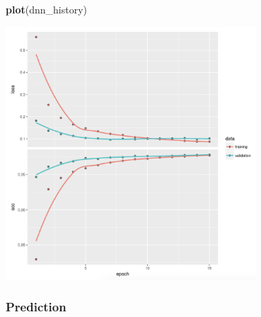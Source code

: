 \documentclass[12pt,]{krantz}
\makeatletter
\newenvironment{Shaded}{\begin{snugshade}}{\end{snugshade}}
\newcommand{\KeywordTok}[1]{\textcolor[rgb]{0.27,0.27,0.27}{\textbf{#1}}}
\newcommand{\NormalTok}[1]{#1}
\newcommand{\OperatorTok}[1]{\textcolor[rgb]{0.43,0.43,0.43}{\textbf{#1}}}
\newcommand{\StringTok}[1]{\textcolor[rgb]{0.5,0.5,0.5}{#1}}
\newenvironment{kframe}{%
\medskip{}
\setlength{\fboxsep}{.8em}
 \def\at@end@of@kframe{}%
 \ifinner\ifhmode%
  \def\at@end@of@kframe{\end{minipage}}%
  \begin{minipage}{\columnwidth}%
 \fi\fi%
 \def\FrameCommand##1{\hskip\@totalleftmargin \hskip-\fboxsep
 \colorbox{shadecolor}{##1}\hskip-\fboxsep
     \hskip-\linewidth \hskip-\@totalleftmargin \hskip\columnwidth}%
 \MakeFramed {\advance\hsize-\width
   \@totalleftmargin\z@ \linewidth\hsize
   \@setminipage}}%
 {\par\unskip\endMakeFramed%
 \at@end@of@kframe}
\renewenvironment{Shaded}{\begin{kframe}}{\end{kframe}}
\makeatother
\begin{document}
\begin{Shaded}
\begin{Highlighting}[]
\KeywordTok{plot}\NormalTok{(dnn_history)}
\end{Highlighting}
\end{Shaded}

\includegraphics[width=0.7\textwidth,height=\textheight]{images/dnn_history.png}

\hypertarget{prediction}{%
\subsubsection{Prediction}\label{prediction}}

\begin{Shaded}
\end{Shaded}
\end{document}
